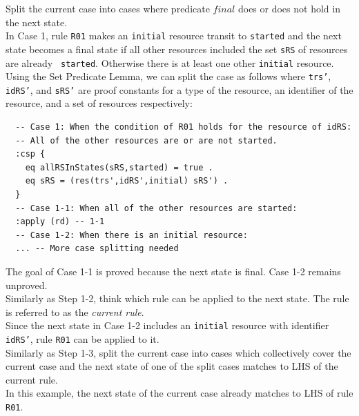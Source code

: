\documentclass[12pt]{report}
\begin{document}
 Split the current case into cases where
predicate $final$ does or does not hold in the next state.\\ 
In Case 1, rule {\tt R01} makes an {\tt initial} resource transit to
{\tt started} and the next state becomes a final state if all other
resources included the set {\tt sRS} of resources are already {\tt
  started}. Otherwise there is at least one other {\tt initial}
resource.  Using the Set Predicate Lemma, we can split the case as follows where
{\tt trs'}, {\tt idRS'}, and {\tt sRS'} are proof constants for a
type of the resource, an identifier of the resource, and a set of
resources respectively:
\small
\begin{verbatim}
  -- Case 1: When the condition of R01 holds for the resource of idRS:
  -- All of the other resources are or are not started.
  :csp {
    eq allRSInStates(sRS,started) = true .
    eq sRS = (res(trs',idRS',initial) sRS') .
  }
  -- Case 1-1: When all of the other resources are started:
  :apply (rd) -- 1-1
  -- Case 1-2: When there is an initial resource:
  ... -- More case splitting needed
\end{verbatim}
\normalsize
The goal of Case 1-1 is proved because the next state is final.  Case
1-2 remains unproved.\\

 Similarly as Step 1-2, think which rule can
be applied to the next state. The rule is referred to as the {\it current
rule}.\\
Since the next state in Case 1-2 includes an {\tt initial} resource
with identifier {\tt idRS'}, rule {\tt R01} can be applied to it.\\

 Similarly as Step 1-3, split the current case
into cases which collectively cover the current case and the next state of one of the split cases
matches to LHS of the current rule. \\ 
In this example, the next state of the current case already matches to LHS of rule {\tt R01}.\\
\end{document}
